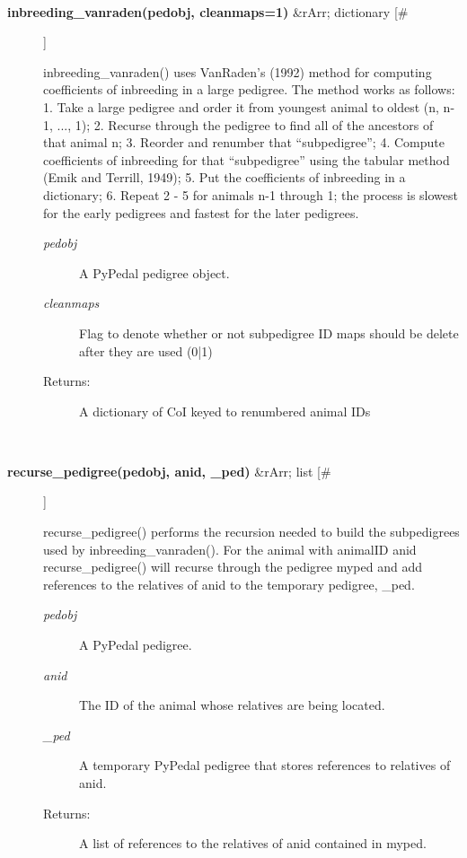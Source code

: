 \documentclass[10pt]{article}
\begin{document}
\begin{description}
\begin{description}
\end{description}
\\ 

\item[\textbf{inbreeding\_vanraden(pedobj, cleanmaps=1)}
 \&rArr; dictionary [\#]]

 inbreeding\_vanraden() uses VanRaden's (1992) method for computing coefficients of inbreeding in a large pedigree. The method works as follows: 1. Take a large pedigree and order it from youngest animal to oldest (n, n-1, ..., 1); 2. Recurse through the pedigree to find all of the ancestors of that animal n; 3. Reorder and renumber that ``subpedigree''; 4. Compute coefficients of inbreeding for that ``subpedigree'' using the tabular method (Emik and Terrill, 1949); 5. Put the coefficients of inbreeding in a dictionary; 6. Repeat 2 - 5 for animals n-1 through 1; the process is slowest for the early pedigrees and fastest for the later pedigrees.
\begin{description}
\item[\emph{pedobj}
] A PyPedal pedigree object.
\item[\emph{cleanmaps}
] Flag to denote whether or not subpedigree ID maps should be delete after they are used (0|1)
\item[Returns:] A dictionary of CoI keyed to renumbered animal IDs

\end{description}
\\ 

\item[\textbf{recurse\_pedigree(pedobj, anid, \_ped)}
 \&rArr; list [\#]]

 recurse\_pedigree() performs the recursion needed to build the subpedigrees used by inbreeding\_vanraden(). For the animal with animalID anid recurse\_pedigree() will recurse through the pedigree myped and add references to the relatives of anid to the temporary pedigree, \_ped.
\begin{description}
\item[\emph{pedobj}
] A PyPedal pedigree.
\item[\emph{anid}
] The ID of the animal whose relatives are being located.
\item[\emph{\_ped}
] A temporary PyPedal pedigree that stores references to relatives of anid.
\item[Returns:] A list of references to the relatives of anid contained in myped.

\end{description}
\\ 


\end{description}
\end{document}
